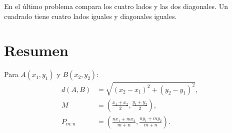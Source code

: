 \begin{hints}
En el último problema compara los cuatro lados y las dos diagonales. Un
cuadrado tiene cuatro lados iguales y diagonales iguales.
\end{hints}

\enlargethispage{5\baselineskip}
\section*{Resumen}

\begin{properties}
Para $A(x_1,y_1)$ y $B(x_2,y_2)$:
\[
\begin{aligned}
d(A,B)&=\sqrt{(x_2-x_1)^2+(y_2-y_1)^2},\\[2mm]
M&=\left(\frac{x_1+x_2}{2},\frac{y_1+y_2}{2}\right),\\[2mm]
P_{m:n}&=\left(\frac{nx_1+mx_2}{m+n},
\frac{ny_1+my_2}{m+n}\right).
\end{aligned}
\]
\end{properties}
